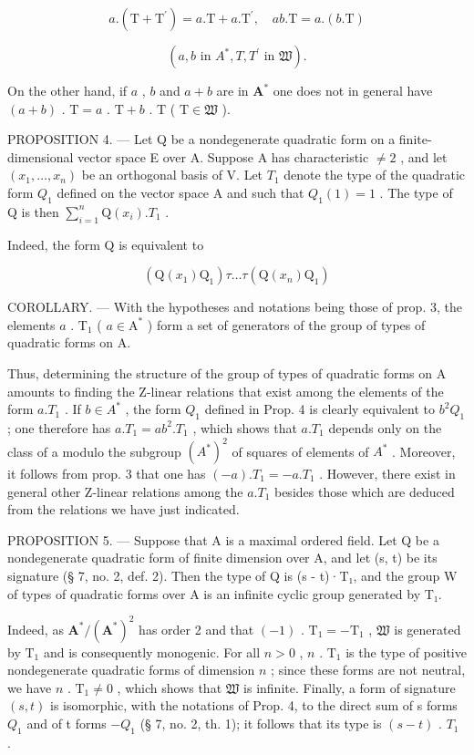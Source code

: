 \[
a. (\mathrm{T} + \mathrm{T} ^ {\prime}) = a. \mathrm{T} + a. \mathrm{T} ^ {\prime}, \quad a b. \mathrm{T} = a. (b. \mathrm{T})\tag{4}
\]

\[
(a, b \text {   in   } A ^ {*}, T, T ^ {\prime} \text {   in   } \mathfrak {W}).
\]

On the other hand, if \(a\) , \(b\) and \(a + b\) are in \(\mathbf{A}^*\) one does not in general have \((a + b)\) . \(\mathrm{T} = a\) . \(\mathrm{T} + b\) . \(\mathrm{T}\) ( \(\mathrm{T} \in \mathfrak{W}\) ).

PROPOSITION 4. --- Let Q be a nondegenerate quadratic form on a finite-dimensional vector space E over A. Suppose A has characteristic \(\neq 2\) , and let \((x_{1},\ldots,x_{n})\) be an orthogonal basis of V. Let \(T_{1}\) denote the type of the quadratic form \(Q_{1}\) defined on the vector space A and such that \(Q_{1}(1)=1\) . The type of Q is then \(\sum_{i=1}^{n}\mathrm{Q}(x_{i}).T_{1}\) .

Indeed, the form Q is equivalent to

\[
(\mathrm{Q} (x _ {1}) \mathrm{Q} _ {1}) \tau \dots \tau (\mathrm{Q} (x _ {n}) \mathrm{Q} _ {1})
\]

COROLLARY. --- With the hypotheses and notations being those of prop. 3, the elements \(a\) . \(\mathrm{T}_{1}\) ( \(a \in \mathrm{A}^{*}\) ) form a set of generators of the group of types of quadratic forms on A.

Thus, determining the structure of the group of types of quadratic forms on A amounts to finding the Z-linear relations that exist among the elements of the form \(a.T_{1}\) . If \(b \in A^{*}\) , the form \(Q_{1}\) defined in Prop. 4 is clearly equivalent to \(b^{2}Q_{1}\) ; one therefore has \(a.T_{1} = ab^{2}.T_{1}\) , which shows that \(a.T_{1}\) depends only on the class of a modulo the subgroup \((A^{*})^{2}\) of squares of elements of \(A^{*}\) . Moreover, it follows from prop. 3 that one has \((-a).T_{1} = -a.T_{1}\) . However, there exist in general other Z-linear relations among the \(a.T_{1}\) besides those which are deduced from the relations we have just indicated.

PROPOSITION 5. --- Suppose that A is a maximal ordered field. Let Q be a nondegenerate quadratic form of finite dimension over A, and let (s, t) be its signature (§ 7, no. 2, def. 2). Then the type of Q is (s - t)·T₁, and the group W of types of quadratic forms over A is an infinite cyclic group generated by T₁.

Indeed, as \(\mathbf{A}^{*}/(\mathbf{A}^{*})^{2}\) has order 2 and that \((-1)\) . \(\mathrm{T}_{1} = -\mathrm{T}_{1}\) , \(\mathfrak{W}\) is generated by \(\mathrm{T}_{1}\) and is consequently monogenic. For all \(n > 0\) , \(n\) . \(\mathrm{T}_{1}\) is the type of positive nondegenerate quadratic forms of dimension \(n\) ; since these forms are not neutral, we have \(n\) . \(\mathrm{T}_{1} \neq 0\) , which shows that \(\mathfrak{W}\) is infinite. Finally, a form of signature \((s, t)\) is isomorphic, with the notations of Prop. 4, to the direct sum of s forms \(Q_{1}\) and of t forms \(-Q_{1}\) (§ 7, no. 2, th. 1); it follows that its type is \((s - t)\) . \(T_{1}\) .

